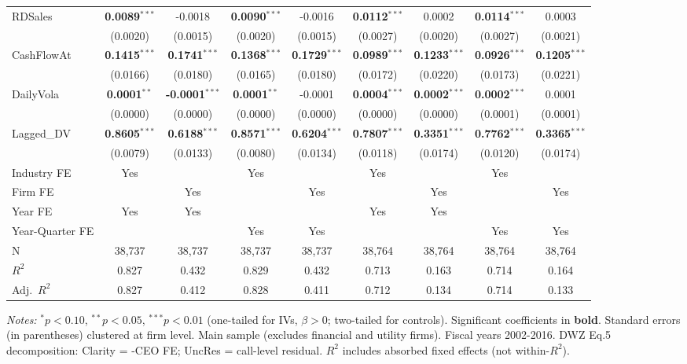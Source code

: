 \begin{landscape}
\begin{table}[H]
\begin{tabular}{lcccccccc}
RDSales & \textbf{0.0089}$^{***}$ & -0.0018 & \textbf{0.0090}$^{***}$ & -0.0016 & \textbf{0.0112}$^{***}$ & 0.0002 & \textbf{0.0114}$^{***}$ & 0.0003 \\
 & (0.0020) & (0.0015) & (0.0020) & (0.0015) & (0.0027) & (0.0020) & (0.0027) & (0.0021) \\
CashFlowAt & \textbf{0.1415}$^{***}$ & \textbf{0.1741}$^{***}$ & \textbf{0.1368}$^{***}$ & \textbf{0.1729}$^{***}$ & \textbf{0.0989}$^{***}$ & \textbf{0.1233}$^{***}$ & \textbf{0.0926}$^{***}$ & \textbf{0.1205}$^{***}$ \\
 & (0.0166) & (0.0180) & (0.0165) & (0.0180) & (0.0172) & (0.0220) & (0.0173) & (0.0221) \\
DailyVola & \textbf{0.0001}$^{**}$ & \textbf{-0.0001}$^{***}$ & \textbf{0.0001}$^{**}$ & -0.0001 & \textbf{0.0004}$^{***}$ & \textbf{0.0002}$^{***}$ & \textbf{0.0002}$^{***}$ & 0.0001 \\
 & (0.0000) & (0.0000) & (0.0000) & (0.0000) & (0.0000) & (0.0000) & (0.0001) & (0.0001) \\
Lagged\_DV & \textbf{0.8605}$^{***}$ & \textbf{0.6188}$^{***}$ & \textbf{0.8571}$^{***}$ & \textbf{0.6204}$^{***}$ & \textbf{0.7807}$^{***}$ & \textbf{0.3351}$^{***}$ & \textbf{0.7762}$^{***}$ & \textbf{0.3365}$^{***}$ \\
 & (0.0079) & (0.0133) & (0.0080) & (0.0134) & (0.0118) & (0.0174) & (0.0120) & (0.0174) \\
\midrule
Industry FE & Yes &  & Yes &  & Yes &  & Yes &  \\
Firm FE &  & Yes &  & Yes &  & Yes &  & Yes \\
Year FE & Yes & Yes &  &  & Yes & Yes &  &  \\
Year-Quarter FE &  &  & Yes & Yes &  &  & Yes & Yes \\
\midrule
N & 38,737 & 38,737 & 38,737 & 38,737 & 38,764 & 38,764 & 38,764 & 38,764 \\
$R^2$ & 0.827 & 0.432 & 0.829 & 0.432 & 0.713 & 0.163 & 0.714 & 0.164 \\
Adj.~$R^2$ & 0.827 & 0.412 & 0.828 & 0.411 & 0.712 & 0.134 & 0.714 & 0.133 \\
\bottomrule
\end{tabular}
\begin{minipage}{\linewidth}
\vspace{2pt}\scriptsize
\textit{Notes:} $^{*}p<0.10$, $^{**}p<0.05$, $^{***}p<0.01$ (one-tailed for IVs, $\beta > 0$; two-tailed for controls).
 Significant coefficients in \textbf{bold}.
 Standard errors (in parentheses) clustered at firm level.
 Main sample (excludes financial and utility firms). Fiscal years 2002-2016. DWZ Eq.5 decomposition: Clarity = -CEO FE; UncRes = call-level residual.
 $R^2$ includes absorbed fixed effects (not within-$R^2$).
\end{minipage}
\end{table}
\end{landscape}